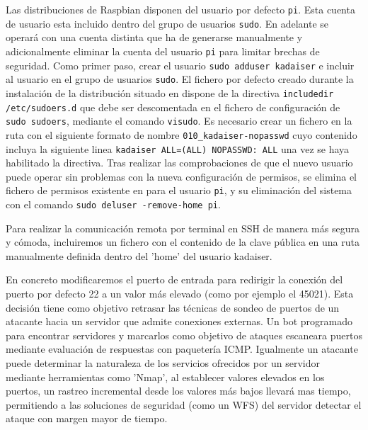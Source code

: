 Las distribuciones de Raspbian disponen del usuario por defecto \verb|pi|. Esta cuenta de usuario esta incluido dentro del grupo de usuarios \verb|sudo|. En adelante se operará con una cuenta distinta que ha de generarse manualmente y adicionalmente eliminar la cuenta del usuario \verb|pi| para limitar brechas de seguridad. Como primer paso, crear el usuario \verb|sudo adduser kadaiser| e incluir al usuario en el grupo de usuarios \verb|sudo|. El fichero por defecto creado durante la instalación de la distribución situado en  dispone de la directiva \verb|includedir /etc/sudoers.d| que debe ser descomentada en el fichero de configuración de \verb|sudo sudoers|, mediante el comando \verb|visudo|. Es necesario crear un fichero en la ruta  con el siguiente formato de nombre \verb|010_kadaiser-nopasswd| cuyo contenido incluya la siguiente linea \verb|kadaiser ALL=(ALL) NOPASSWD: ALL| una vez se haya habilitado la directiva. Tras realizar las comprobaciones de que el nuevo usuario puede operar sin problemas con la nueva configuración de permisos, se elimina el fichero de permisos existente en  para el usuario \verb|pi|, y su eliminación del sistema con el comando \verb|sudo deluser -remove-home pi|.

Para realizar la comunicación remota por terminal en SSH de manera más segura y cómoda, incluiremos un fichero con el contenido de la clave pública en una ruta manualmente definida dentro del 'home' del usuario kadaiser.

En concreto modificaremos el puerto de entrada para redirigir la conexión del puerto por defecto 22 a un valor más elevado (como por ejemplo el 45021). Esta decisión tiene como objetivo retrasar las técnicas de sondeo de puertos de un atacante hacia un servidor que admite conexiones externas. Un bot programado para encontrar servidores y marcarlos como objetivo de ataques escaneara puertos mediante evaluación de respuestas con paquetería ICMP. Igualmente un atacante puede determinar la naturaleza de los servicios ofrecidos por un servidor mediante herramientas como 'Nmap', al establecer valores elevados en los puertos, un rastreo incremental desde los valores más bajos llevará mas tiempo, permitiendo a las soluciones de seguridad (como un WFS) del servidor detectar el ataque con margen mayor de tiempo.

